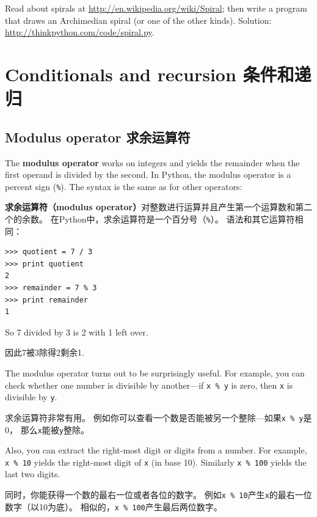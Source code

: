 \documentclass[10pt]{book}
\begin{document}
\begin{CJK}{UTF8}{gbsn}
\begin{exercise}

Read about spirals at \url{http://en.wikipedia.org/wiki/Spiral}; then
write a program that draws an Archimedian spiral (or one of the other
kinds).  Solution: \url{http://thinkpython.com/code/spiral.py}.

\end{exercise}


\chapter{Conditionals and recursion 条件和递归}

\section{Modulus operator 求余运算符}

The {\bf modulus operator} works on integers and yields the remainder
when the first operand is divided by the second.  In Python, the
modulus operator is a percent sign (\verb"%").  The syntax is the same
as for other operators:

{\bf 求余运算符（modulus operator）}对整数进行运算并且产生第一个运算数和第二个的余数。
在Python中，求余运算符是一个百分号（\verb"%"）。
语法和其它运算符相同：

\begin{verbatim}
>>> quotient = 7 / 3
>>> print quotient
2
>>> remainder = 7 % 3
>>> print remainder
1
\end{verbatim}
%
So 7 divided by 3 is 2 with 1 left over.

因此7被3除得2剩余1.

The modulus operator turns out to be surprisingly useful.  For
example, you can check whether one number is divisible by another---if
{\tt x \% y} is zero, then {\tt x} is divisible by {\tt y}.

求余运算符非常有用。
例如你可以查看一个数是否能被另一个整除---如果{\tt x \% y}是0，
那么{\tt x}能被{\tt y}整除。

Also, you can extract the right-most digit
or digits from a number.  For example, {\tt x \% 10} yields the
right-most digit of {\tt x} (in base 10).  Similarly {\tt x \% 100}
yields the last two digits.

同时，你能获得一个数的最右一位或者各位的数字。
例如{\tt x \% 10}产生{\tt x}的最右一位数字（以10为底）。
相似的，{\tt x \% 100}产生最后两位数字。



\end{CJK}
\end{document}

